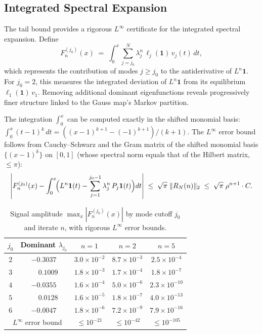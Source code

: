 \documentclass[11pt]{article}
\begin{document}
\subsection*{Integrated Spectral Expansion}

The tail bound provides a rigorous $L^\infty$ certificate for the integrated
spectral expansion.  Define
\[
F_n^{(j_0)}(x) \;=\; \int_0^x \sum_{j=j_0}^{N} \lambda_j^n \,\ell_j(\mathbf{1})\, v_j(t)\, dt,
\]
which represents the contribution of modes $j \geq j_0$ to the
antiderivative of $L^n \mathbf{1}$.  For $j_0 = 2$, this measures the
integrated deviation of $L^n\mathbf{1}$ from its equilibrium $\ell_1(\mathbf{1})\,v_1$.
Removing additional dominant eigenfunctions reveals progressively finer
structure linked to the Gauss map's Markov partition.

The integration $\int_0^x$ can be computed exactly in the shifted monomial
basis: $\int_0^x (t - 1)^k \,dt = ((x-1)^{k+1} - (-1)^{k+1})/(k+1)$.
The $L^\infty$ error bound follows from Cauchy--Schwarz and the Gram
matrix of the shifted monomial basis $\{(x-1)^k\}$ on $[0,1]$
(whose spectral norm equals that of the Hilbert matrix, $\leq \pi$):
\[
\left| F_n^{(j_0)}(x) - \int_0^x \!\Bigl(L^n\mathbf{1}(t)
  - \sum_{j=1}^{j_0-1} \lambda_j^n\,P_j\mathbf{1}(t)\Bigr) dt \right|
\;\leq\;
\sqrt{\pi}\;\|R_N(n)\|_2
\;\leq\; \sqrt{\pi}\;\rho^{n+1} \cdot C.
\]

\begin{table}[ht]
\centering
\caption{Signal amplitude $\max_x |F_n^{(j_0)}(x)|$ by mode cutoff $j_0$
  and iterate $n$, with rigorous $L^\infty$ error bounds.}
\label{tab:integrated-spectral}
\smallskip
\begin{tabular}{c c c c c}
\toprule
$j_0$ & Dominant $\lambda_{j_0}$ & $n=1$ & $n=2$ & $n=5$ \\
\midrule
$2$ & $-0.3037$ & $3.0 \times 10^{-2}$ & $8.7 \times 10^{-3}$ & $2.5 \times 10^{-4}$ \\
$3$ & $\phantom{-}0.1009$ & $1.8 \times 10^{-3}$ & $1.7 \times 10^{-4}$ & $1.8 \times 10^{-7}$ \\
$4$ & $-0.0355$ & $1.6 \times 10^{-4}$ & $5.0 \times 10^{-6}$ & $2.3 \times 10^{-10}$ \\
$5$ & $\phantom{-}0.0128$ & $1.6 \times 10^{-5}$ & $1.8 \times 10^{-7}$ & $4.0 \times 10^{-13}$ \\
$6$ & $-0.0047$ & $1.8 \times 10^{-6}$ & $7.2 \times 10^{-9}$ & $7.9 \times 10^{-16}$ \\
\midrule
\multicolumn{2}{c}{$L^\infty$ error bound} & $\leq 10^{-21}$ & $\leq 10^{-42}$ & $\leq 10^{-105}$ \\
\bottomrule
\end{tabular}
\end{table}
\end{document}
